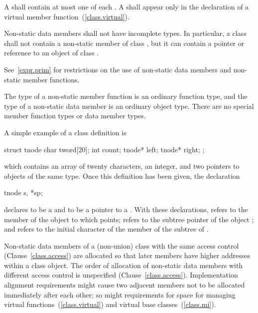 \pnum
A  shall contain at most one of each
.
A 
shall appear only in the declaration of a virtual member
function~(\ref{class.virtual}).

\pnum
{}%
Non-static data members shall not have
incomplete types. In particular, a class  shall not contain a
non-static member of class , but it can contain a pointer or
reference to an object of class .

\pnum
\begin{note}
See~\ref{expr.prim} for restrictions on the use of non-static data
members and non-static member functions.
\end{note}

\pnum
\begin{note}
The type of a non-static member function is an ordinary function type,
and the type of a non-static data member is an ordinary object type.
There are no special member function types or data member types.
\end{note}

\pnum
{}%
\begin{example}
A simple example of a class definition is

\begin{codeblock}
struct tnode {
  char tword[20];
  int count;
  tnode* left;
  tnode* right;
};
\end{codeblock}

which contains an array of twenty characters, an integer, and two
pointers to objects of the same type. Once this definition has been
given, the declaration

\begin{codeblock}
tnode s, *sp;
\end{codeblock}

declares  to be a  and  to be a pointer
to a . With these declarations,  refers to
the  member of the object to which  points;
 refers to the  subtree pointer of the object
; and  refers to the initial character
of the  member of the  subtree of .
\end{example}

\pnum
{}%
Non-static data members of a (non-union) class
with the same access control (Clause~\ref{class.access})
are allocated so that later
members have higher addresses within a class object.
%
The order of allocation of non-static data members
with different access control
is unspecified (Clause~\ref{class.access}).
Implementation alignment requirements might cause two adjacent members
not to be allocated immediately after each other; so might requirements
for space for managing virtual functions~(\ref{class.virtual}) and
virtual base classes~(\ref{class.mi}).


